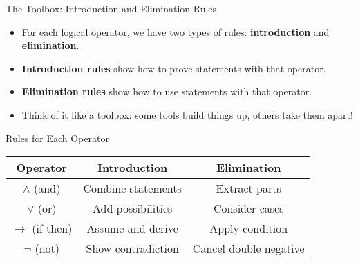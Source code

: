 \documentclass{beamer}
\begin{document}
	\begin{frame}{The Toolbox: Introduction and Elimination Rules}
		\begin{itemize}
			\item For each logical operator, we have two types of rules: \textbf{introduction} and \textbf{elimination}.
			\item \textbf{Introduction rules} show how to prove statements with that operator.
			\item \textbf{Elimination rules} show how to use statements with that operator.
			\item Think of it like a toolbox: some tools build things up, others take them apart!
		\end{itemize}
		
		\begin{block}{Rules for Each Operator}
			\begin{tabular}{|c|c|c|}
				\hline
				\textbf{Operator} & \textbf{Introduction} & \textbf{Elimination} \\
				\hline
				$\land$ (and) & Combine statements & Extract parts \\
				$\lor$ (or) & Add possibilities & Consider cases \\
				$\rightarrow$ (if-then) & Assume and derive & Apply condition \\
				$\neg$ (not) & Show contradiction & Cancel double negative \\
				\hline
			\end{tabular}
		\end{block}
	\end{frame}
	
\end{document}
